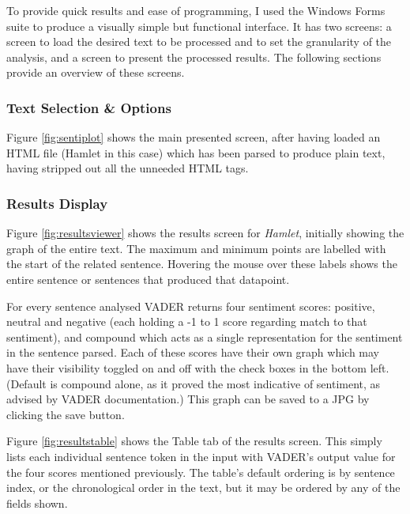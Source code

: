 \documentclass{article}
\begin{document}
{        To provide quick results and ease of programming, I used the Windows Forms suite to produce a visually simple but functional interface. It has two screens: a screen to load the desired text to be processed and to set the granularity of the analysis, and a screen to present the processed results. The following sections provide an overview of these screens.
    \subsubsection{Text Selection \& Options}
    Figure \ref{fig:sentiplot} shows the main presented screen, after having loaded an HTML file (Hamlet in this case) which has been parsed to produce plain text, having stripped out all the unneeded HTML tags.
    \subsubsection{Results Display}
        Figure \ref{fig:resultsviewer} shows the results screen for \textit{Hamlet}, initially showing the graph of the entire text. The maximum and minimum points are labelled with the start of the related sentence. Hovering the mouse over these labels shows the entire sentence or sentences that produced that datapoint.

        For every sentence analysed VADER returns four sentiment scores: positive, neutral and negative (each holding a -1 to 1 score regarding match to that sentiment), and compound which acts as a single representation for the sentiment in the sentence parsed. Each of these scores have their own graph which may have their visibility toggled on and off with the check boxes in the bottom left. (Default is compound alone, as it proved the most indicative of sentiment, as advised by VADER documentation.) This graph can be saved to a JPG by clicking the save button.

        Figure \ref{fig:resultstable} shows the Table tab of the results screen. This simply lists each individual sentence token in the input with VADER’s output value for the four scores mentioned previously. The table’s default ordering is by sentence index, or the chronological order in the text, but it may be ordered by any of the fields shown.

}
\end{document}
